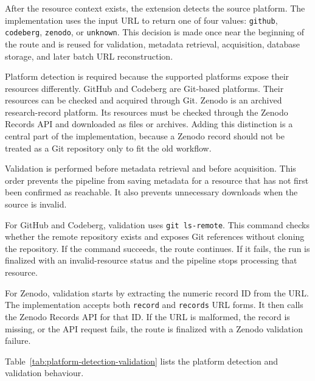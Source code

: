 After the resource context exists, the extension detects the source platform. The implementation uses the input URL to return one of four values: \texttt{github}, \texttt{codeberg}, \texttt{zenodo}, or \texttt{unknown}. This decision is made once near the beginning of the route and is reused for validation, metadata retrieval, acquisition, database storage, and later batch URL reconstruction.

Platform detection is required because the supported platforms expose their resources differently. GitHub and Codeberg are Git-based platforms. Their resources can be checked and acquired through Git. Zenodo is an archived research-record platform. Its resources must be checked through the Zenodo Records API and downloaded as files or archives. Adding this distinction is a central part of the implementation, because a Zenodo record should not be treated as a Git repository only to fit the old workflow.

Validation is performed before metadata retrieval and before acquisition. This order prevents the pipeline from saving metadata for a resource that has not first been confirmed as reachable. It also prevents unnecessary downloads when the source is invalid.

For GitHub and Codeberg, validation uses \texttt{git ls-remote}. This command checks whether the remote repository exists and exposes Git references without cloning the repository. If the command succeeds, the route continues. If it fails, the run is finalized with an invalid-resource status and the pipeline stops processing that resource.

For Zenodo, validation starts by extracting the numeric record ID from the URL. The implementation accepts both \texttt{record} and \texttt{records} URL forms. It then calls the Zenodo Records API for that ID. If the URL is malformed, the record is missing, or the API request fails, the route is finalized with a Zenodo validation failure.

Table~\ref{tab:platform-detection-validation} lists the platform detection and validation behaviour.

